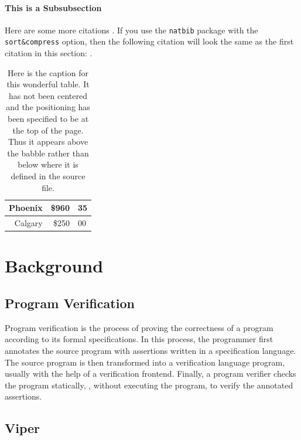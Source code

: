 \documentclass[msc,oneside]{ubcthesis}
\begin{document}
\subsubsection{This is a Subsubsection}
Here are some more citations \cite{LL3:1977,Peccei:1989,Turner:1999}.
If you use the \texttt{natbib} package with the \verb+sort&compress+
option, then the following citation will look the same as the first
citation in this section: \cite{Turner:1999,Peccei:1989,LL3:1977}.


\begin{table}[t]                 %
  \begin{tabular}{|r||r@{.}l|}
    \hline
    Phoenix & \$960&35\\
    \hline
    Calgary & \$250&00\\
    \hline
  \end{tabular}
  \caption[Here is the caption for this wonderful table\ldots]{
    \label{tab:Table1}
    Here is the caption for this wonderful table. It has not been
    centered and the positioning has been specified to be at the top
    of the page.  Thus it appears above the babble rather than below
    where it is defined in the source file.}
\end{table}

\newpage

\chapter{Background}

\section{Program Verification}

Program verification is the process of proving the correctness of a program according to its formal specifications. In this process, the programmer first annotates the source program with assertions written in a specification language. The source program is then transformed into a verification language program, usually with the help of a verification frontend. Finally, a program verifier checks the program statically, \ie, without executing the program, to verify the annotated assertions.

\section{Viper}
\end{document}
